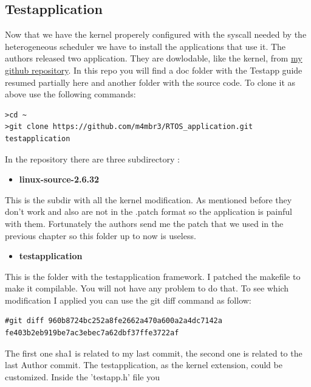 \documentclass[a4paper,13pt]{article}
\begin{document}
\begin{multicols}{2}
\subsection{Testapplication}
    Now that we have the kernel properely configured with the syscall needed by the heterogeneous
    scheduler we have to install the applications that use it. The authors released two application.
    They are dowlodable, like the kernel, from \href{https://github.com/m4mbr3/RTOS_application.git}{my github repository}.
    In this repo you will find a doc folder with the Testapp guide \cite{doc_testapp} resumed partially here and 
    another folder with the source code.
    To clone it as above use the following commands:
\begin{lstlisting}
>cd ~
>git clone https://github.com/m4mbr3/RTOS_application.git testapplication
\end{lstlisting}
    In the repository there are three subdirectory :
    \vspace{4ex}
    \begin{itemize}
        \item{{\bf linux-source-2.6.32}}\\
    \end{itemize}
    \vspace{-2ex}
        This is the subdir with all the kernel modification. As mentioned before they don't work and also
        are not in the .patch format so the application is painful with them. Fortunately the authors
        send me the patch that we used in the previous chapter so this folder up to now is useless.
    \vspace{4ex}
    \begin{itemize}
        \item{{\bf testapplication}}\\
    \end{itemize}
    \vspace{-2ex}
        This is the folder with the testapplication framework. I patched the makefile to make it compilable.
        You will not have any problem to do that. To see which  modification I applied you can use the git diff
        command as follow:
        \begin{lstlisting}
#git diff 960b8724bc252a8fe2662a470a600a2a4dc7142a fe403b2eb919be7ac3ebec7a62dbf37ffe3722af
        \end{lstlisting}
        The first one sha1 is related to my last commit, the second one is related to the last Author commit.
               The testapplication, as the kernel extension, could be customized. Inside the 'testapp.h' file you

\end{multicols}
\end{document}
